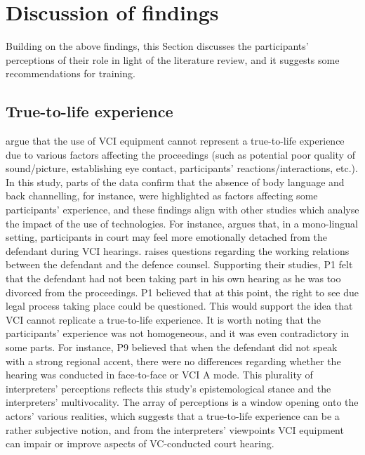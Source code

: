 \documentclass[output=paper]{langsci/langscibook}
\begin{document}
\section{Discussion of findings}
\label{sec:devaux:6}
Building on the above findings, this Section discusses the participants’ perceptions of their role in light of the literature review, and it suggests some recommendations for training.

\subsection{True-to-life experience}

\citet{vanRotterdam2011} argue that the use of \textsc{VCI} equipment cannot represent a true-to-life experience due to various factors affecting the proceedings (such as potential poor quality of sound/picture, establishing eye contact, participants’ reactions/interactions, etc.). In this study, parts of the data confirm that the absence of body language and back channelling, for instance, were highlighted as factors affecting some participants’ experience, and these findings align with other studies which analyse the impact of the use of technologies. For instance, \citet{Radburn-Remfry1994} argues that, in a mono-lingual setting, participants in court may feel more emotionally detached from the defendant during \textsc{VCI} hearings. \citet{Hodges2008} raises questions regarding the working relations between the defendant and the defence counsel. Supporting their studies, P1 felt that the defendant had not been taking part in his own hearing as he was too divorced from the proceedings. P1 believed that at this point, the right to see due legal process taking place could be questioned. This would support the idea that \textsc{VCI} cannot replicate a true-to-life experience. It is worth noting that the participants’ experience was not homogeneous, and it was even contradictory in some parts. For instance, P9 believed that when the defendant did not speak with a strong regional accent, there were no differences regarding whether the hearing was conducted in face-to-face or \textsc{VCI} A mode. This plurality of interpreters’ perceptions reflects this study’s epistemological stance and the interpreters’ multivocality. The array of perceptions is a window opening onto the actors’ various realities, which suggests that a true-to-life experience can be a rather subjective notion, and from the interpreters’ viewpoints \textsc{VCI} equipment can impair or improve aspects of VC-conducted court hearing.
\end{document}

